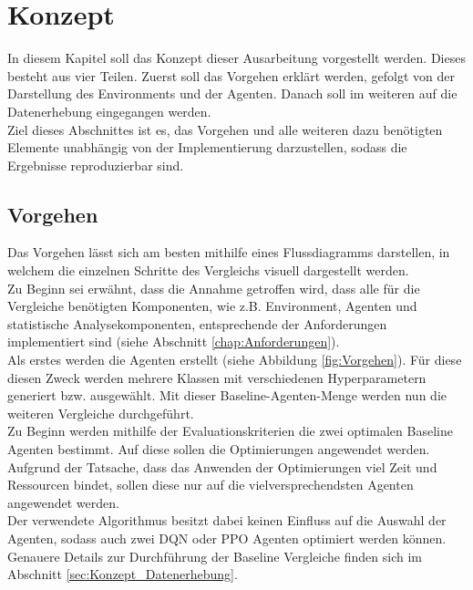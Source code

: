 \chapter{Konzept} \label{chap:Konzept}
In diesem Kapitel soll das Konzept dieser Ausarbeitung vorgestellt werden. Dieses besteht aus vier Teilen. Zuerst soll das Vorgehen erklärt werden, gefolgt von der Darstellung des Environments und der Agenten. Danach soll im weiteren auf die Datenerhebung eingegangen werden.\\
Ziel dieses Abschnittes ist es, das Vorgehen und alle weiteren dazu benötigten Elemente unabhängig von der Implementierung darzustellen, sodass die Ergebnisse reproduzierbar sind.

\section{Vorgehen} \label{sec:Konzept_Vorgehen}
Das Vorgehen lässt sich am besten mithilfe eines Flussdiagramms darstellen, in welchem die einzelnen Schritte des Vergleichs visuell dargestellt werden.\\
Zu Beginn sei erwähnt, dass die Annahme getroffen wird, dass alle für die Vergleiche benötigten Komponenten, wie z.B. Environment, Agenten und statistische Analysekomponenten, entsprechende der Anforderungen implementiert sind (siehe Abschnitt \ref{chap:Anforderungen}).\\
Als erstes werden die Agenten erstellt (siehe Abbildung \ref{fig:Vorgehen}). Für diese diesen Zweck werden mehrere Klassen mit verschiedenen Hyperparametern generiert bzw. ausgewählt.
Mit dieser Baseline-Agenten-Menge werden nun die weiteren Vergleiche durchgeführt.\\
Zu Beginn werden mithilfe der Evaluationskriterien die zwei optimalen Baseline Agenten bestimmt. Auf diese sollen die Optimierungen angewendet werden. 
Aufgrund der Tatsache, dass das Anwenden der Optimierungen viel Zeit und Ressourcen bindet, sollen diese nur auf die vielversprechendsten Agenten angewendet werden.\\
Der verwendete Algorithmus besitzt dabei keinen Einfluss auf die Auswahl der Agenten, sodass auch zwei DQN oder PPO Agenten optimiert werden können. Genauere Details zur Durchführung der Baseline Vergleiche finden sich im Abschnitt \ref{sec:Konzept_Datenerhebung}.
